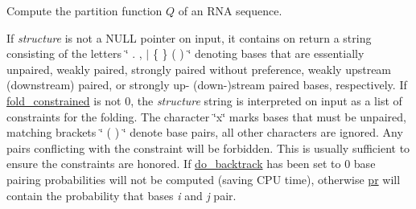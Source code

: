 Compute the partition function $Q$ of an R\+NA sequence. 

If {\itshape structure} is not a N\+U\+LL pointer on input, it contains on return a string consisting of the letters \char`\"{} . , $\vert$ \{ \} ( ) \char`\"{} denoting bases that are essentially unpaired, weakly paired, strongly paired without preference, weakly upstream (downstream) paired, or strongly up-\/ (down-\/)stream paired bases, respectively. If \mbox{\hyperlink{fold__vars_8h_a0afc287c2464866d94858c39175154af}{fold\+\_\+constrained}} is not 0, the {\itshape structure} string is interpreted on input as a list of constraints for the folding. The character \char`\"{}x\char`\"{} marks bases that must be unpaired, matching brackets \char`\"{} ( ) \char`\"{} denote base pairs, all other characters are ignored. Any pairs conflicting with the constraint will be forbidden. This is usually sufficient to ensure the constraints are honored. If \mbox{\hyperlink{group__model__details_gad512b5dd4dbec60faccfe137bb474489}{do\+\_\+backtrack}} has been set to 0 base pairing probabilities will not be computed (saving C\+PU time), otherwise \mbox{\hyperlink{fold__vars_8h_ac98ec419070aee6831b44e5c700f090f}{pr}} will contain the probability that bases {\itshape i} and {\itshape j} pair.

